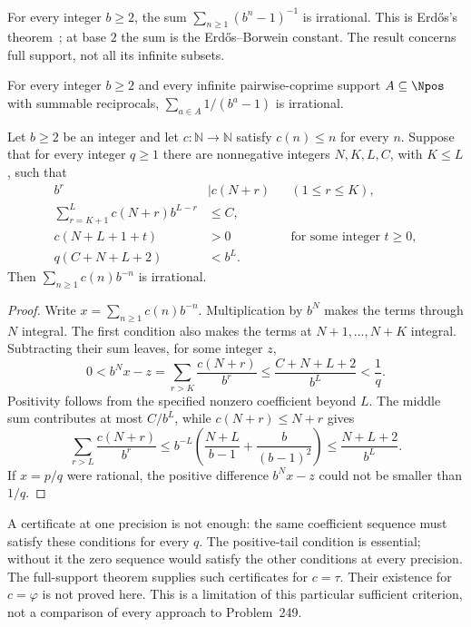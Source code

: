 \begin{thm}
\label{thm:full-support-catalogue}
For every integer $b\ge2$, the sum $\sum_{n\ge1}(b^n-1)^{-1}$
is irrational.  This is Erd\H{o}s's theorem~\cite{erdos1948}; at base
$2$ the sum is the Erd\H{o}s--Borwein constant.  The result concerns
full support, not all its infinite subsets.
\end{thm}

\begin{thm}
\label{thm:pairwise-coprime}
For every integer $b\ge2$ and every infinite pairwise-coprime support
$A\subseteq\Npos$ with summable reciprocals, $\sum_{a\in A} 1/(b^a-1)$ is irrational.
\end{thm}

\begin{thm}
\label{thm:weighted-coeff-engine}
Let $b\ge2$ be an integer and let $c:\mathbb N\to\mathbb N$ satisfy
$c(n)\le n$ for every $n$.  Suppose that for every integer $q\ge1$
there are nonnegative integers $N,K,L,C$, with $K\le L$, such that
\[
 \begin{aligned}
 b^r&\mid c(N+r) &&(1\le r\le K),\\
 \sum_{r=K+1}^{L}c(N+r)b^{L-r}&\le C,\\
 c(N+L+1+t)&>0 &&\text{for some integer }t\ge0,\\
 q(C+N+L+2)&<b^L.
 \end{aligned}
\]
Then $\sum_{n\ge1}c(n)b^{-n}$ is irrational.
\end{thm}
\begin{proof}
Write $x=\sum_{n\ge1}c(n)b^{-n}$.  Multiplication by $b^N$
makes the terms through $N$ integral.  The first condition also
makes the terms at $N+1,\ldots,N+K$ integral.  Subtracting their
sum leaves, for some integer $z$,
\[
 0<b^Nx-z=\sum_{r>K}\frac{c(N+r)}{b^r}
 \le\frac{C+N+L+2}{b^L}<\frac1q.
\]
Positivity follows from the specified nonzero coefficient beyond $L$.
The middle sum contributes at most $C/b^L$, while $c(N+r)\le N+r$
gives
\[
 \sum_{r>L}\frac{c(N+r)}{b^r}
 \le b^{-L}\left(\frac{N+L}{b-1}+\frac{b}{(b-1)^2}\right)
 \le\frac{N+L+2}{b^L}.
\]
If $x=p/q$ were rational, the positive difference $b^Nx-z$
could not be smaller than $1/q$.
\end{proof}

A certificate at one precision is not enough: the same coefficient
sequence must satisfy these conditions for every $q$.  The positive-tail
condition is essential; without it the zero sequence would satisfy the
other conditions at every precision.  The full-support theorem supplies
such certificates for $c=\tau$.  Their existence for $c=\varphi$ is not
proved here.  This is a limitation of this particular sufficient
criterion, not a comparison of every approach to Problem~249.


